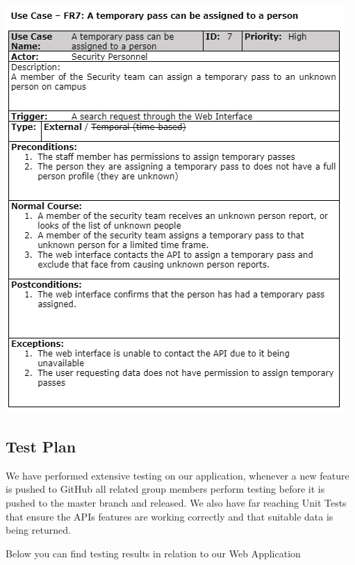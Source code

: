 \documentclass[
  english,
  a4paper,
,tablecaptionabove
]{scrartcl}
\begin{document}
\includegraphics{images/ppm-images/use-case-7.png} \newpage

\hypertarget{test-plan}{%
\subsection{Test Plan}\label{test-plan}}

We have performed extensive testing on our application, whenever a new
feature is pushed to GitHub all related group members perform testing
before it is pushed to the master branch and released. We also have far
reaching Unit Tests that ensure the APIs features are working correctly
and that suitable data is being returned.

Below you can find testing results in relation to our Web Application
\end{document}
